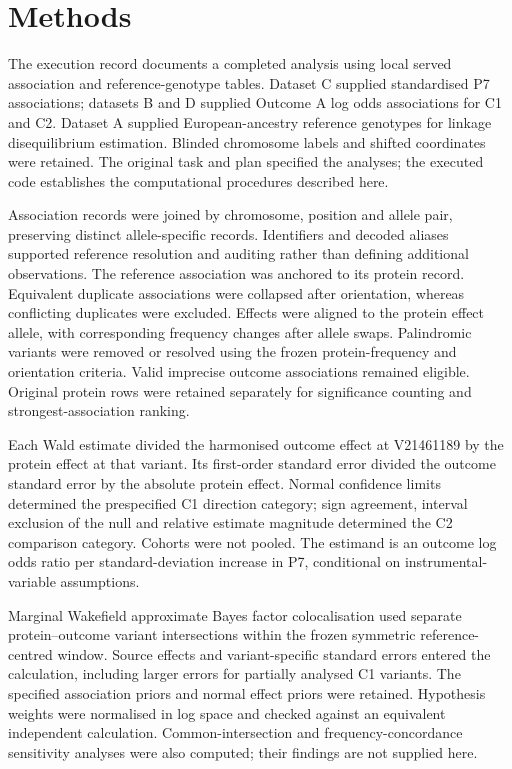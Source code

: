 \documentclass[10pt,a4paper]{article}
\begin{document}
\section*{Methods}
The execution record documents a completed analysis using local served association and reference-genotype tables. Dataset C supplied standardised P7 associations; datasets B and D supplied Outcome A log odds associations for C1 and C2. Dataset A supplied European-ancestry reference genotypes for linkage disequilibrium estimation. Blinded chromosome labels and shifted coordinates were retained. The original task and plan specified the analyses; the executed code establishes the computational procedures described here.
\par
Association records were joined by chromosome, position and allele pair, preserving distinct allele-specific records. Identifiers and decoded aliases supported reference resolution and auditing rather than defining additional observations. The reference association was anchored to its protein record. Equivalent duplicate associations were collapsed after orientation, whereas conflicting duplicates were excluded. Effects were aligned to the protein effect allele, with corresponding frequency changes after allele swaps. Palindromic variants were removed or resolved using the frozen protein-frequency and orientation criteria. Valid imprecise outcome associations remained eligible. Original protein rows were retained separately for significance counting and strongest-association ranking.
\par
Each Wald estimate divided the harmonised outcome effect at V21461189 by the protein effect at that variant. Its first-order standard error divided the outcome standard error by the absolute protein effect. Normal confidence limits determined the prespecified C1 direction category; sign agreement, interval exclusion of the null and relative estimate magnitude determined the C2 comparison category. Cohorts were not pooled. The estimand is an outcome log odds ratio per standard-deviation increase in P7, conditional on instrumental-variable assumptions.
\par
Marginal Wakefield approximate Bayes factor colocalisation used separate protein–outcome variant intersections within the frozen symmetric reference-centred window. Source effects and variant-specific standard errors entered the calculation, including larger errors for partially analysed C1 variants. The specified association priors and normal effect priors were retained. Hypothesis weights were normalised in log space and checked against an equivalent independent calculation. Common-intersection and frequency-concordance sensitivity analyses were also computed; their findings are not supplied here.
\end{document}
